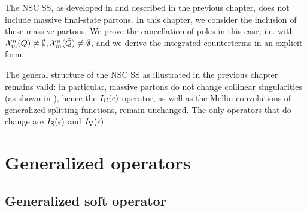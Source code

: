 
The NSC SS, as developed in \cite{rontsch-2023, rontsch-2503, rontsch-2509} and described in the previous chapter, does not include massive final-state partons. In this chapter, we consider the inclusion of these massive partons. We prove the cancellation of poles in this case, i.e. with $ \mathcal{X}^{n}_{m}(Q) \neq \emptyset , \mathcal{X}^{n}_{m}(\bar{Q}) \neq \emptyset $, and we derive the integrated counterterms in an explicit form.

The general structure of the NSC SS as illustrated in the previous chapter remains valid: in particular, massive partons do not change collinear singularities (as shown in ), hence the $ I_\text{C}(\epsilon) $ operator, as well as the Mellin convolutions of generalized splitting functions, remain unchanged. The only operators that do change are $ I_\text{S}(\epsilon) $ and $ I_\text{V}(\epsilon) $.

\section{Generalized operators}

\subsection{Generalized soft operator}

